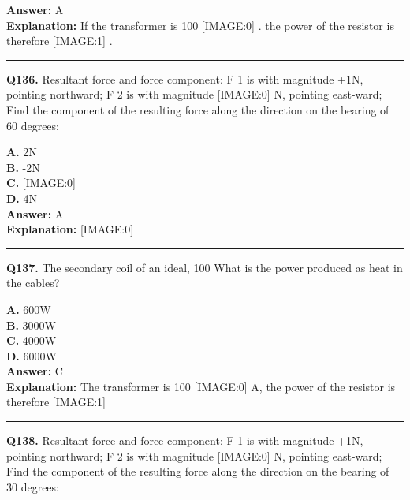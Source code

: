 \documentclass[12pt]{article}
\begin{document}
\textbf{Answer:} A \\
\textbf{Explanation:} If the transformer is 100%
[IMAGE:0]
. the power of the resistor is therefore
[IMAGE:1]
.

\hrule
\vspace{1em}


\noindent
\textbf{Q136.} Resultant force and force component:
F
1
is with magnitude +1N, pointing northward; F
2
is with magnitude
[IMAGE:0]
N, pointing east-ward; Find the component of the resulting force along the direction on the bearing of 60 degrees:



\textbf{A.} 2N \\
\textbf{B.} -2N \\
\textbf{C.} [IMAGE:0] \\
\textbf{D.} 4N \\

\textbf{Answer:} A \\
\textbf{Explanation:} [IMAGE:0]

\hrule
\vspace{1em}


\noindent
\textbf{Q137.} The secondary coil of an ideal, 100%
What is the power produced as heat in the cables?



\textbf{A.} 600W \\
\textbf{B.} 3000W \\
\textbf{C.} 4000W \\
\textbf{D.} 6000W \\

\textbf{Answer:} C \\
\textbf{Explanation:} The transformer is 100%
[IMAGE:0]
A, the power of the resistor is therefore
[IMAGE:1]

\hrule
\vspace{1em}


\noindent
\textbf{Q138.} Resultant force and force component:
F
1
is with magnitude +1N, pointing northward; F
2
is with magnitude
[IMAGE:0]
N, pointing east-ward; Find the component of the resulting force along the direction on the bearing of 30 degrees:
\end{document}
